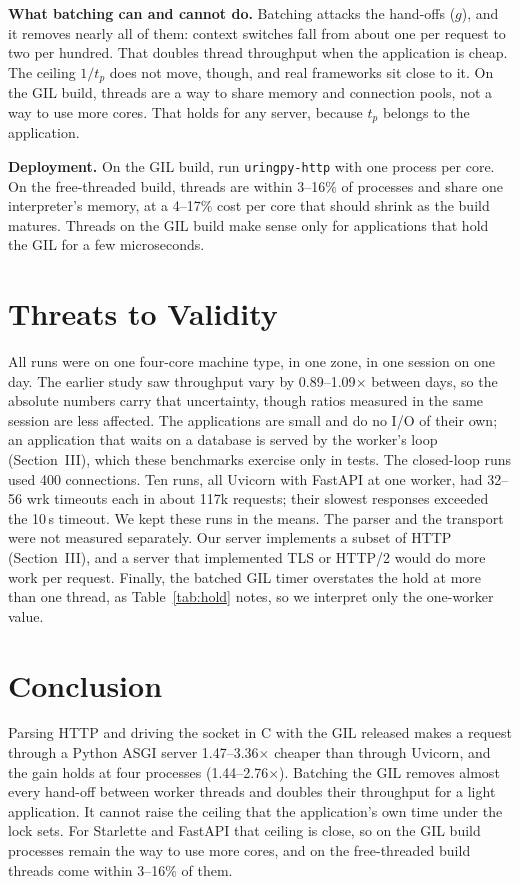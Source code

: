 \documentclass[10pt,twocolumn,letterpaper]{article}
\newcommand{\code}[1]{\texttt{#1}}
\newcommand{\kx}{$\times$}
\begin{document}
\textbf{What batching can and cannot do.} Batching attacks the hand-offs
($g$), and it removes nearly all of them: context switches fall from about
one per request to two per hundred. That doubles thread throughput when the
application is cheap. The ceiling $1/t_p$ does not move, though, and real
frameworks sit close to it. On the GIL build, threads are a way to share
memory and connection pools, not a way to use more cores. That holds for
any server, because $t_p$ belongs to the application.

\textbf{Deployment.} On the GIL build, run \code{uringpy-http} with one
process per core. On the free-threaded build, threads are within 3--16\% of
processes and share one interpreter's memory, at a 4--17\% cost per core
that should shrink as the build matures. Threads on the GIL build make
sense only for applications that hold the GIL for a few microseconds.

\section{Threats to Validity}

All runs were on one four-core machine type, in one zone, in one session on
one day. The earlier study saw throughput vary by 0.89--1.09\kx{} between
days, so the absolute numbers carry that uncertainty, though ratios measured
in the same session are less affected. The applications are small and do no
I/O of their own; an application that waits on a database is served by the
worker's loop (Section~III), which these benchmarks exercise only in tests.
The closed-loop runs used 400 connections. Ten runs, all Uvicorn with
FastAPI at one worker, had 32--56 wrk timeouts each in about 117k requests;
their slowest responses exceeded the 10\,s timeout. We kept these runs in
the means. The parser and the transport were not measured separately. Our
server implements a subset of HTTP (Section~III), and a server that
implemented TLS or HTTP/2 would do more work per request. Finally, the
batched GIL timer overstates the hold at more than one thread, as
Table~\ref{tab:hold} notes, so we interpret only the one-worker value.

\section{Conclusion}

Parsing HTTP and driving the socket in C with the GIL released makes a
request through a Python ASGI server 1.47--3.36\kx{} cheaper than through
Uvicorn, and the gain holds at four processes (1.44--2.76\kx{}). Batching
the GIL removes almost every hand-off between worker threads and doubles
their throughput for a light application. It cannot raise the ceiling that
the application's own time under the lock sets. For Starlette and FastAPI
that ceiling is close, so on the GIL build processes remain the way to use
more cores, and on the free-threaded build threads come within 3--16\% of
them.
\end{document}
